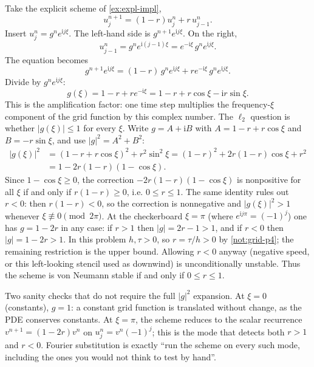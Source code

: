 \documentclass[11pt,a4paper]{article}
\begin{document}
\begin{example}
\label{ex:fourier-subst}
Take the explicit scheme of \cref{ex:expl-impl},
\[
u_j^{n+1}
=
(1-r)u_j^n
+
r\,u_{j-1}^n.
\]
Insert \(u_j^n=g^n e^{\mathrm i j\xi}\). The left-hand side is \(g^{n+1}e^{\mathrm i j\xi}\). On the right,
\[
u_{j-1}^n
=
g^n e^{\mathrm i(j-1)\xi}
=
e^{-\mathrm i\xi}\,g^n e^{\mathrm i j\xi}.
\]
The equation becomes
\[
g^{n+1}e^{\mathrm i j\xi}
=
(1-r)\,g^n e^{\mathrm i j\xi}
+
r e^{-\mathrm i\xi}\,g^n e^{\mathrm i j\xi}.
\]
Divide by \(g^n e^{\mathrm i j\xi}\):
\[
g(\xi)
=
1-r+r e^{-\mathrm i\xi}
=
1-r+r\cos\xi
-
\mathrm i r\sin\xi.
\]
This is the amplification factor: one time step multiplies the frequency-\(\xi\) component of the grid function by this complex number. The \(\ell_2\) question is whether \(\lvert g(\xi)\rvert\le 1\) for every \(\xi\). Write \(g=A+\mathrm i B\) with \(A=1-r+r\cos\xi\) and \(B=-r\sin\xi\), and use \(\lvert g\rvert^2=A^2+B^2\):
\begin{align*}
\lvert g(\xi)\rvert^2
&=
(1-r+r\cos\xi)^2
+
r^2\sin^2\xi
=
(1-r)^2
+
2r(1-r)\cos\xi
+
r^2
\\
&=
1-2r(1-r)(1-\cos\xi).
\end{align*}
Since \(1-\cos\xi\ge 0\), the correction \(-2r(1-r)(1-\cos\xi)\) is nonpositive for all \(\xi\) if and only if \(r(1-r)\ge 0\), i.e. \(0\le r\le 1\). The same identity rules out \(r<0\): then \(r(1-r)<0\), so the correction is nonnegative and \(\lvert g(\xi)\rvert^2>1\) whenever \(\xi\not\equiv 0\pmod{2\pi}\). At the checkerboard \(\xi=\pi\) (where \(e^{\mathrm i j\pi}=(-1)^j\)) one has \(g=1-2r\) in any case: if \(r>1\) then \(\lvert g\rvert=2r-1>1\), and if \(r<0\) then \(\lvert g\rvert=1-2r>1\). In this problem \(h,\tau>0\), so \(r=\tau/h>0\) by \cref{not:grid-p4}; the remaining restriction is the upper bound. Allowing \(r<0\) anyway (negative speed, or this left-looking stencil used as downwind) is unconditionally unstable. Thus the scheme is von Neumann stable if and only if \(0\le r\le 1\).

Two sanity checks that do not require the full \(\lvert g\rvert^2\) expansion. At \(\xi=0\) (constants), \(g=1\): a constant grid function is translated without change, as the PDE conserves constants. At \(\xi=\pi\), the scheme reduces to the scalar recurrence \(v^{n+1}=(1-2r)v^n\) on \(u_j^n=v^n(-1)^j\); this is the mode that detects both \(r>1\) and \(r<0\). Fourier substitution is exactly ``run the scheme on every such mode, including the ones you would not think to test by hand''.
\end{example}
\end{document}
